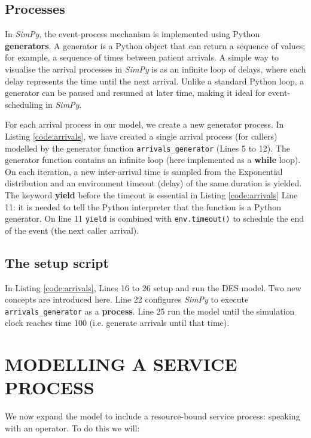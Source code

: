 \documentclass{swpaperproc}
\theoremstyle{sw}
\begin{document}
\subsection{Processes}
\label{sec:processes}

In \textit{SimPy}, the event-process mechanism is implemented using Python \textbf{generators}. A generator is a Python object that can return a sequence of values; for example, a sequence of times between patient arrivals. A simple way to visualise the arrival processes in \textit{SimPy} is as an infinite loop of delays, where each delay represents the time until the next arrival. Unlike a standard Python loop, a generator can be paused and resumed at later time, making it ideal for event-scheduling in \textit{SimPy}. 

For each arrival process in our model, we create a new generator process. In Listing \ref{code:arrivals}, we have created a single arrival process (for callers) modelled by the generator function \verb|arrivals_generator| (Lines 5 to 12). The generator function contains an infinite loop (here implemented as a \textbf{while} loop). On each iteration, a new inter-arrival time is sampled from the Exponential distribution and an environment timeout (delay) of the same duration is yielded.  The keyword \textbf{yield} before the timeout is essential in Listing \ref{code:arrivals} Line 11: it is needed to tell the Python interpreter that the function is a Python generator. On line 11 \verb|yield| is combined with \verb|env.timeout()| to schedule the end of the event (the next caller arrival).

\subsection{The setup script}
\label{subsec:setup}

In Listing \ref{code:arrivals}, Lines 16 to 26 setup and run the DES model. Two new concepts are introduced here. Line 22 configures \textit{SimPy} to execute \verb|arrivals_generator| as a \textbf{process}. Line 25 run the model until the simulation clock reaches time 100 (i.e. generate arrivals until that time). 

\section{MODELLING A SERVICE PROCESS}
\label{sec:service}

We now expand the model to include a resource-bound service process: speaking with an operator.  To do this we will:
\end{document}
